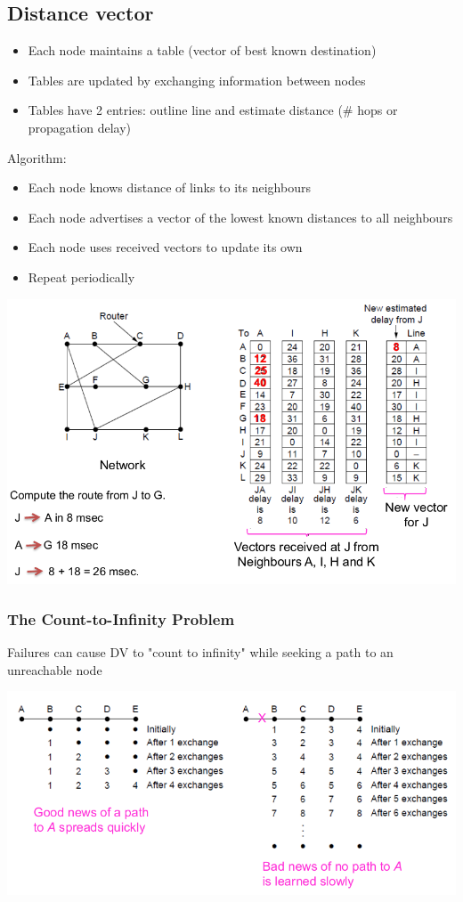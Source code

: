 \documentclass{article}[18pt]
\begin{document}
\subsection{Distance vector}
\begin{itemize}
	\item Each node maintains a table (vector of best known destination)
	\item Tables are updated by exchanging information between nodes
	\item Tables have 2 entries: outline line and estimate distance (\# hops or propagation delay)
\end{itemize}
Algorithm:
\begin{itemize}
	\item Each node knows distance of links to its neighbours
	\item Each node advertises a vector of the lowest known distances to all neighbours
	\item Each node uses received vectors to update its own
	\item Repeat periodically
\end{itemize}
\begin{center}
	\includegraphics[scale=0.7]{distance_vector_routing}
\end{center}
\subsubsection{The Count-to-Infinity Problem}
Failures can cause DV to "count to infinity" while seeking a path to an unreachable node
\begin{center}
	\includegraphics[scale=0.7]{infinity}
\end{center}
\end{document}
